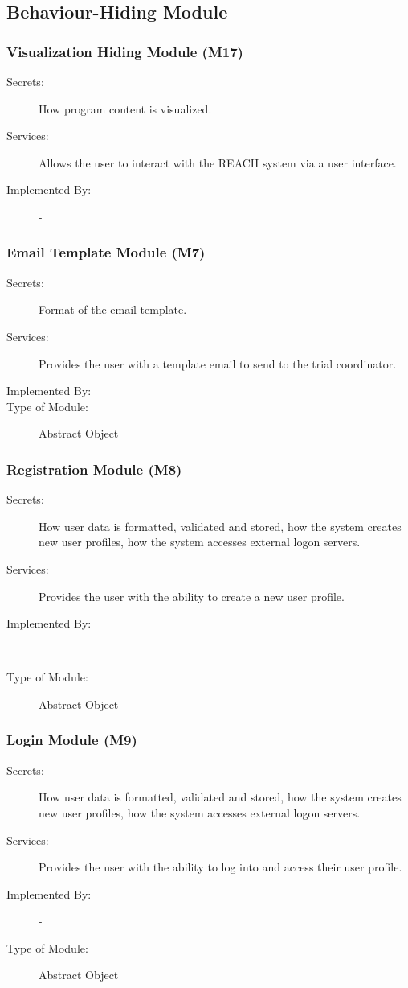 \documentclass[12pt, titlepage]{article}
\begin{document}
\subsection{Behaviour-Hiding Module}

\subsubsection{Visualization Hiding Module (M17)}
\begin{description}
\item[Secrets:] How program content is visualized.
\item[Services:] Allows the user to interact with the REACH system via a user interface.
\item[Implemented By:] -
\end{description}

\subsubsection{Email Template Module (M7)}
\begin{description}
\item[Secrets:] Format of the email template.
\item[Services:] Provides the user with a template email to send to the trial coordinator.
\item[Implemented By:] 
\item[Type of Module:] Abstract Object \\
\end{description}

\subsubsection{Registration Module (M8)}
\begin{description}
\item[Secrets:] How user data is formatted, validated and stored, how the system creates new user profiles, how the system accesses external logon servers.
\item[Services:] Provides the user with the ability to create a new user profile.
\item[Implemented By:] -
\item[Type of Module:] Abstract Object \\
\end{description}

\subsubsection{Login Module (M9)}
\begin{description}
\item[Secrets:] How user data is formatted, validated and stored, how the system creates new user profiles, how the system accesses external logon servers.
\item[Services:] Provides the user with the ability to log into and access their user profile.
\item[Implemented By:] -
\item[Type of Module:] Abstract Object \\
\end{description}
\end{document}
